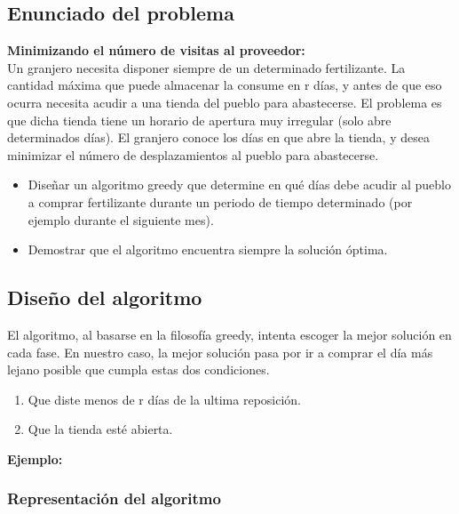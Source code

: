 \subsection{Enunciado del problema}
\textbf{Minimizando el número de visitas al proveedor:}\\

Un granjero necesita disponer siempre de un determinado fertilizante. La cantidad máxima que puede almacenar la consume en r días, y antes de que eso ocurra necesita acudir a una tienda del pueblo para abastecerse. El problema es que dicha tienda tiene un horario de apertura muy irregular (solo abre determinados días). El granjero conoce los días en que abre la tienda, y desea minimizar el número de desplazamientos al pueblo para abastecerse.\\

\begin{itemize}
\item Diseñar un algoritmo greedy que determine en qué días debe acudir al pueblo a comprar fertilizante durante un periodo de tiempo determinado (por ejemplo durante el siguiente mes).\\
\item Demostrar que el algoritmo encuentra siempre la solución  óptima.\\
\end{itemize}


\subsection{Diseño del algoritmo}

El algoritmo, al basarse en la filosofía greedy, intenta escoger la mejor solución en cada fase. En nuestro caso, la mejor solución pasa por ir a comprar el día más lejano posible que cumpla estas dos condiciones.\\
\begin{enumerate}
\item Que diste menos de r días de la ultima reposición.\\
\item Que la tienda esté abierta.\\
\end{enumerate}

\textbf{Ejemplo:}\\



\subsubsection{Representación del algoritmo}

